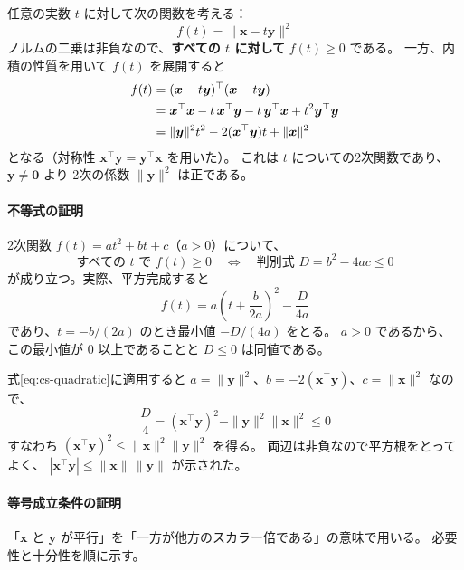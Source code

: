 任意の実数 $t$ に対して次の関数を考える：
\begin{equation}
  f(t) = \|\bm{x} - t\bm{y}\|^2
\end{equation}
ノルムの二乗は非負なので、\textbf{すべての $t$ に対して} $f(t) \geq 0$ である。
一方、内積の性質を用いて $f(t)$ を展開すると
\begin{align}
  f(t) &= (\bm{x} - t\bm{y})^\top (\bm{x} - t\bm{y}) \notag \\
       &= \bm{x}^\top \bm{x} - t\, \bm{x}^\top \bm{y} - t\, \bm{y}^\top \bm{x} + t^2 \bm{y}^\top \bm{y} \notag \\
       &= \|\bm{y}\|^2 t^2 - 2 (\bm{x}^\top \bm{y}) t + \|\bm{x}\|^2
  \label{eq:cs-quadratic}
\end{align}
となる（対称性 $\bm{x}^\top \bm{y} = \bm{y}^\top \bm{x}$ を用いた）。
これは $t$ についての2次関数であり、$\bm{y} \neq \bm{0}$ より
2次の係数 $\|\bm{y}\|^2$ は正である。

\paragraph{不等式の証明}
2次関数 $f(t) = at^2 + bt + c$（$a > 0$）について、
\begin{equation}
  \text{すべての } t \text{ で } f(t) \geq 0
  \quad \Longleftrightarrow \quad
  \text{判別式 } D = b^2 - 4ac \leq 0
\end{equation}
が成り立つ。実際、平方完成すると
\begin{equation}
  f(t) = a\left( t + \frac{b}{2a} \right)^2 - \frac{D}{4a}
\end{equation}
であり、$t = -b/(2a)$ のとき最小値 $-D/(4a)$ をとる。
$a > 0$ であるから、この最小値が $0$ 以上であることと $D \leq 0$ は同値である。

式\eqref{eq:cs-quadratic}に適用すると
$a = \|\bm{y}\|^2$、$b = -2(\bm{x}^\top \bm{y})$、$c = \|\bm{x}\|^2$ なので、
\begin{equation}
  \frac{D}{4} = (\bm{x}^\top \bm{y})^2 - \|\bm{y}\|^2 \|\bm{x}\|^2 \leq 0
  \label{eq:cs-disc}
\end{equation}
すなわち $(\bm{x}^\top \bm{y})^2 \leq \|\bm{x}\|^2 \|\bm{y}\|^2$ を得る。
両辺は非負なので平方根をとってよく、
$|\bm{x}^\top \bm{y}| \leq \|\bm{x}\| \, \|\bm{y}\|$ が示された。

\paragraph{等号成立条件の証明}
「$\bm{x}$ と $\bm{y}$ が平行」を「一方が他方のスカラー倍である」の意味で用いる。
必要性と十分性を順に示す。

